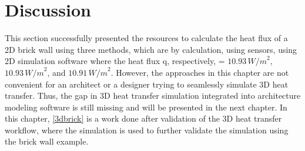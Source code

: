 \section{Discussion}
This section successfully presented the resources to calculate the heat flux of a 2D brick wall using three methods, which are by calculation, using sensors, using 2D simulation software where the heat flux q, respectively, = \( 10.93 \, {W/m}^2 \), \( 10.93 \, {W/m}^2 \), and \( 10.91 \, {W/m}^2 \). However, the approaches in this chapter are not convenient for an architect or a designer trying to seamlessly simulate 3D heat transfer. Thus, the gap in 3D heat transfer simulation integrated into architecture modeling software is still missing and will be presented in the next chapter. In this chapter, \ref{3dbrick} is a work done after validation of the 3D heat transfer workflow, where the simulation is used to further validate the simulation using the brick wall example.